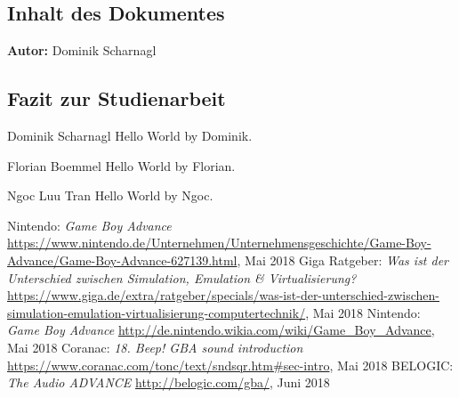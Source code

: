 \documentclass[11pt,a4paper]{scrartcl}
\newcommand{\AutorDominik} {
    \vspace{-4mm}
    \large \textbf{Autor:} Dominik Scharnagl \normalsize
    \vspace{2mm}
}
\begin{document}
\subsection{Inhalt des Dokumentes}
\AutorDominik

\subsection{Fazit zur Studienarbeit}

\large Dominik Scharnagl
\vspace{2mm}\newline
Hello World by Dominik.

\vspace{5mm}
\large Florian Boemmel
\vspace{2mm}\newline
Hello World by Florian.

\vspace{5mm}
\large Ngoc Luu Tran
\vspace{2mm}\newline
Hello World by Ngoc.


\newpage
{}

\begin{thebibliography}{tiefe}
    Nintendo: \textit{Game Boy Advance}\newline
    \url{https://www.nintendo.de/Unternehmen/Unternehmensgeschichte/Game-Boy-Advance/Game-Boy-Advance-627139.html}, Mai 2018
    Giga Ratgeber: \textit{Was ist der Unterschied zwischen Simulation, Emulation \& Virtualisierung?}\newline
    \url{https://www.giga.de/extra/ratgeber/specials/was-ist-der-unterschied-zwischen-simulation-emulation-virtualisierung-computertechnik/}, Mai 2018
    Nintendo: \textit{Game Boy Advance}\newline
    \url{http://de.nintendo.wikia.com/wiki/Game_Boy_Advance}, Mai 2018
    Coranac: \textit{18. Beep! GBA sound introduction}\newline
    \url{https://www.coranac.com/tonc/text/sndsqr.htm#sec-intro}, Mai 2018
    BELOGIC: \textit{The Audio ADVANCE}\newline
    \url{http://belogic.com/gba/}, Juni 2018
\end{thebibliography}

\vspace{1cm}
\end{document}
